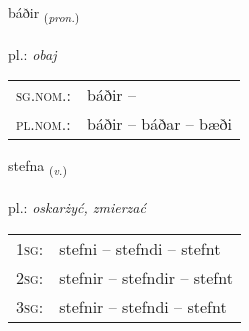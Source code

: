 \documentclass[frontgrid, backgrid]{flacards}\usepackage[]{graphicx}\usepackage[]{xcolor}
\begin{document}
\renewcommand{\flhead}{\vskip5pt \fboxsep=0pt {\small\bfseries\footnotesize Fornafn | Pronoun}}
\renewcommand{\fcfoot}{\vskip5pt \fboxsep=0pt \hspace{2pt}{\small\bfseries\footnotesize 1K}}

\renewcommand{\blhead}{\vskip5pt {\small\bfseries\footnotesize Fornafn | Pronoun }}
\renewcommand{\bcfoot}{\vskip5pt \hspace{2pt}{\small\bfseries\footnotesize 1K}}


{báðir \small{\textsubscript{(\textit{pron.})}} \\[1ex] %
\textphonetic{[pauːðɪr]} \\
pl.: \emph{obaj} \\  [2ex]
\renewcommand*{\arraystretch}{0.8}
\begin{tabular}{ll}
\textsc{sg.nom.}: & báðir  -- \\ 
\textsc{pl.nom.}: & báðir -- báðar -- bæði
\end{tabular}
}

\renewcommand{\flhead}{\vskip5pt \fboxsep=0pt {\small\bfseries\footnotesize Sagnorð | Verb}}
\renewcommand{\fcfoot}{\vskip5pt \fboxsep=0pt \hspace{2pt}{\small\bfseries\footnotesize 1K}}

\renewcommand{\blhead}{\vskip5pt {\small\bfseries\footnotesize Sagnorð | Verb }}
\renewcommand{\bcfoot}{\vskip5pt \hspace{2pt}{\small\bfseries\footnotesize 1K}}


{stefna \small{\textsubscript{(\textit{v.})}} \\[1ex] %
\textphonetic{[stɛpna]} \\
pl.: \emph{oskarżyć, zmierzać} \\  [2ex]
\renewcommand*{\arraystretch}{0.8}
\begin{tabular}{p{1cm}l}
\textsc{1sg}: & stefni -- stefndi -- stefnt \\ 
\textsc{2sg}: & stefnir -- stefndir -- stefnt \\ 
\textsc{3sg}: & stefnir -- stefndi -- stefnt \\ 
\end{tabular}
}
\end{document}
